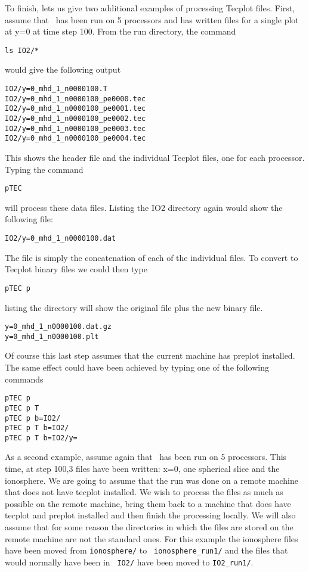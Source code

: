 To finish, lets us give two additional examples of processing Tecplot
files.  First, assume that \BATSRUS\ has been run on 5 processors and
has written files for a single plot at y=0 at time step 100.  From the
run directory, the command
\begin{verbatim}
ls IO2/*
\end{verbatim}
would give the following output
\begin{verbatim}
IO2/y=0_mhd_1_n0000100.T
IO2/y=0_mhd_1_n0000100_pe0000.tec
IO2/y=0_mhd_1_n0000100_pe0001.tec
IO2/y=0_mhd_1_n0000100_pe0002.tec
IO2/y=0_mhd_1_n0000100_pe0003.tec
IO2/y=0_mhd_1_n0000100_pe0004.tec
\end{verbatim}
This shows the header file and the individual Tecplot files, one for
each processor.  Typing the command
\begin{verbatim}
pTEC
\end{verbatim}
will process these data files.  Listing the IO2 directory again would
show the following file:
\begin{verbatim}
IO2/y=0_mhd_1_n0000100.dat
\end{verbatim}
The file is simply the concatenation of each of the individual files.
To convert to Tecplot binary files we could then type
\begin{verbatim}
pTEC p
\end{verbatim}
listing the directory will show the original file plus the new binary file.
\begin{verbatim}
y=0_mhd_1_n0000100.dat.gz  
y=0_mhd_1_n0000100.plt
\end{verbatim}
Of course this last step assumes that the current machine has preplot installed.
The same effect could have been achieved by typing one of the following commands
\begin{verbatim}
pTEC p
pTEC p T
pTEC p b=IO2/
pTEC p T b=IO2/
pTEC p T b=IO2/y=
\end{verbatim}

As a second example, assume again that \BATSRUS\ has been run on 5
processors.  This time, at step 100,3 files have been written: x=0, one
spherical slice and the ionosphere.  We are going to assume that the
run was done on a remote machine that does not have tecplot installed.
We wish to process the files as much as possible on the remote machine,
bring them back to a machine that does have tecplot and preplot
installed and then finish the processing locally.  We will also assume
that for some reason the directories in which the files are stored on
the remote machine are not the standard ones.  For this example the
ionosphere files have been moved from {\tt ionosphere/} to {\tt
ionosphere\_run1/} and the files that would normally have been in {\tt
IO2/} have been moved to {\tt IO2\_run1/}. 

